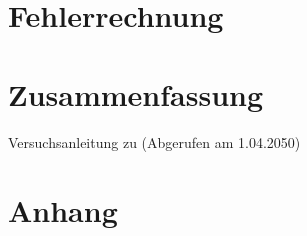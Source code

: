 \documentclass[
12pt,
a4paper,
bibliography=totocnumbered, %
twoside, %
BCOR=1cm, %
]{scrartcl}
\begin{document}
\section{Fehlerrechnung}

\section{Zusammenfassung}


\begin{thebibliography}{999}
	 Versuchsanleitung zu (Abgerufen am 1.04.2050)
\end{thebibliography}


\section{Anhang}


\end{document}
